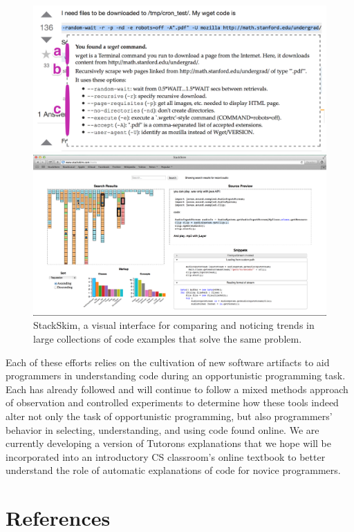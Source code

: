 \documentclass[12pt]{memoir}
\begin{document}
\begin{figure}%
  \centering
  \parbox{.45\textwidth}{%
    \includegraphics[width=\linewidth]{figures/tutorons_microexplanation}
    \caption{%
      A micro-explanation for a command line generated by a Tutoron with multiple levels of detail 
      (definition, high-level intent, arguments)
    }\label{fig:tutorons_microexplanation}
  }%
  \qquad
  \parbox{.45\textwidth}{%
    \includegraphics[width=\linewidth]{figures/stackskim_ui}
    \caption{%
      StackSkim, a visual interface for comparing and noticing trends in large collections of code examples that solve the same problem.
    }\label{fig:stackskim_ui}
  }
\end{figure}

Each of these efforts relies on the cultivation of new software artifacts to aid programmers in understanding code during an opportunistic programming task.
Each has already followed and will continue to follow a mixed methods approach of observation and controlled experiments to determine how these tools indeed alter not only the task of opportunistic programming, but also programmers' behavior in selecting, understanding, and using code found online.
We are currently developing a version of Tutorons explanations that we hope will be incorporated into an introductory CS classroom's online textbook to better understand the role of automatic explanations of code for novice programmers.

\section{References}
\printbibliography[heading=none]
\end{document}
